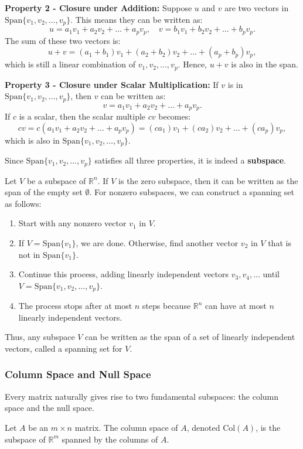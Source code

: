 \documentclass[a4paper,12pt]{article}
\begin{document}
\textbf{Property 2 - Closure under Addition:}
Suppose \( u \) and \( v \) are two vectors in \( \text{Span} \{ v_1, v_2, \dots, v_p \} \). This means they can be written as:
\[
u = a_1v_1 + a_2v_2 + \dots + a_pv_p, \quad v = b_1v_1 + b_2v_2 + \dots + b_pv_p.
\]
The sum of these two vectors is:
\[
u + v = (a_1 + b_1)v_1 + (a_2 + b_2)v_2 + \dots + (a_p + b_p)v_p,
\]
which is still a linear combination of \( v_1, v_2, \dots, v_p \). Hence, \( u + v \) is also in the span.

\textbf{Property 3 - Closure under Scalar Multiplication:}
If \( v \) is in \( \text{Span} \{ v_1, v_2, \dots, v_p \} \), then \( v \) can be written as:
\[
v = a_1v_1 + a_2v_2 + \dots + a_pv_p.
\]
If \( c \) is a scalar, then the scalar multiple \( cv \) becomes:
\[
cv = c(a_1v_1 + a_2v_2 + \dots + a_pv_p) = (ca_1)v_1 + (ca_2)v_2 + \dots + (ca_p)v_p,
\]
which is also in \( \text{Span} \{ v_1, v_2, \dots, v_p \} \).

Since \( \text{Span} \{ v_1, v_2, \dots, v_p \} \) satisfies all three properties, it is indeed a \textbf{subspace}.

\begin{tcolorbox}[title=Subspaces Are Spans, colframe=blue!70!black, colback=blue!5!white]
Let \( V \) be a subspace of \( \mathbb{R}^n \). If \( V \) is the zero subspace, then it can be written as the span of the empty set \( \emptyset \). For nonzero subspaces, we can construct a spanning set as follows:
\end{tcolorbox}
\begin{enumerate}
    \item Start with any nonzero vector \( v_1 \) in \( V \).
    \item If \( V = \text{Span} \{ v_1 \} \), we are done. Otherwise, find another vector \( v_2 \) in \( V \) that is not in \( \text{Span} \{ v_1 \} \).
    \item Continue this process, adding linearly independent vectors \( v_3, v_4, \dots \) until \( V = \text{Span} \{ v_1, v_2, \dots, v_p \} \).
    \item The process stops after at most \( n \) steps because \( \mathbb{R}^n \) can have at most \( n \) linearly independent vectors.
\end{enumerate}

Thus, any subspace \( V \) can be written as the span of a set of linearly independent vectors, called a spanning set for \( V \).

\subsubsection{Column Space and Null Space}
Every matrix naturally gives rise to two fundamental subspaces: the column space and the null space.
\begin{tcolorbox}[title=Definition (Column Space),colframe=blue!70!black, colback=blue!5!white]
Let \( A \) be an \( m \times n \) matrix. The column space of \( A \), denoted \( \text{Col}(A) \), is the subspace of \( \mathbb{R}^m \) spanned by the columns of \( A \).
\end{tcolorbox}
\end{document}
